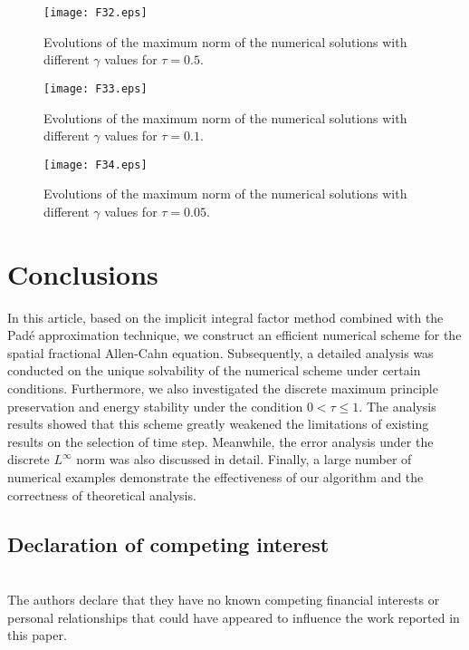 \documentclass{siamart171218}
\numberwithin{theorem}{section}
\numberwithin{equation}{section}
\begin{document}
\begin{example}
\begin{figure}[!htb]
\centering
 \texttt{[image: F32.eps]}\\
  \caption{Evolutions of the maximum norm of the
  numerical solutions with different $\gamma$ values for $\tau=0.5$.}\label{Fig.32}
\end{figure}


\begin{figure}[!htb]
\centering
 \texttt{[image: F33.eps]}\\
  \caption{Evolutions of the maximum norm of the
  numerical solutions with different $\gamma$ values for $\tau=0.1$.}\label{Fig.33}
\end{figure}

\begin{figure}[!htb]
\centering
 \texttt{[image: F34.eps]}\\
  \caption{Evolutions of the maximum norm of the
  numerical solutions with different $\gamma$ values for $\tau=0.05$.}\label{Fig.34}
\end{figure}
\end{example}

\section{Conclusions}
In this article, based on the implicit integral factor method  combined with the
Pad\'{e} approximation technique, we construct an efficient numerical scheme for the
 spatial fractional Allen-Cahn equation. Subsequently, a detailed analysis
 was conducted on the unique solvability of the numerical scheme under certain
 conditions. Furthermore, we also investigated the discrete maximum principle
 preservation and energy stability under the condition $0<\tau\leq1$. The
 analysis results showed that this scheme greatly weakened the limitations of
 existing results on the selection of time step. Meanwhile, the error analysis
 under the discrete $L^\infty$ norm was also discussed in detail. Finally, a large number
 of numerical examples demonstrate the effectiveness of our algorithm
  and the correctness of theoretical analysis.

\subsection*{Declaration of competing interest}\hfill \\

The authors declare that they have no known competing financial
interests or personal relationships that could have appeared
to influence the work reported in this paper.
\end{document}
